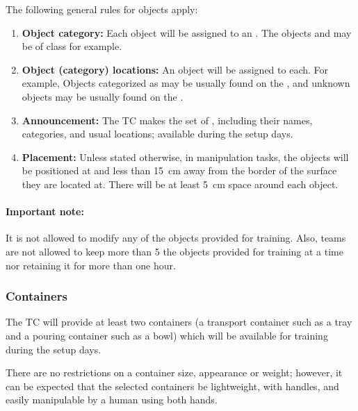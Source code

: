 The following general rules for objects apply:

\begin{enumerate}
	\item \textbf{Object category:} Each object will be assigned to an . The objects  and  may be of class  for example.

	\item \textbf{Object (category) locations:} An  object will be assigned to each. For example, Objects categorized as  may be usually found on the , and unknown objects  may be usually found on the .

	\item \textbf{Announcement:} The TC makes the set of , including their names, categories, and usual locations; available during the setup days. 
	
	\item \textbf{Placement:}  Unless stated otherwise, in manipulation tasks, the objects will be positioned at  and less than \SI{15}{\centi\meter} away from the border of the surface they are located at. There will be at least \SI{5}{\centi\meter} space around each object.
\end{enumerate}

\paragraph*{Important note:} It is not allowed to modify any of the objects provided for training. Also, teams are not allowed to keep more than 5 the objects provided for training at a time nor retaining it for more than one hour.

\subsubsection{Containers}
The TC will provide at least two containers (a transport container such as a tray and a pouring container such as a bowl) which will be available for training during the setup days.

There are no restrictions on a container size, appearance or weight; however, it can be expected that the selected containers be lightweight, with handles, and easily manipulable by a human using both hands.

